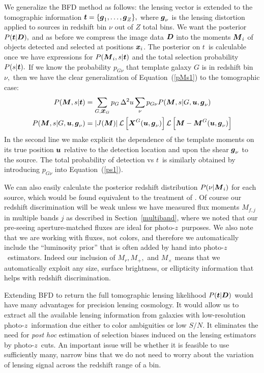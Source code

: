 \documentclass[11pt,preprint,flushrt]{aastex}
\def\eqq#1{Equation~(\ref{#1})}
\newcommand{\vecD}{\mbox{\boldmath $D$}}
\newcommand{\vecX}{\mbox{\boldmath $X$}}
\newcommand{\vecg}{\mbox{\boldmath $g$}}
\newcommand{\vecM}{\mbox{\boldmath $M$}}
\newcommand{\vect}{\mbox{\boldmath $t$}}
\newcommand{\vecx}{\mbox{\boldmath $x$}}
\newcommand{\vecu}{\mbox{\boldmath $u$}}
\newcommand{\likeli}{\mbox{$\mathcal{L}$}}
\newcommand{\photoz}{photo-$z$}
\newcommand\edit[1]{#1}
\begin{document}
We generalize the BFD method as follows: the lensing vector is
extended to the tomographic information
$\vect=\{\vecg_1,\ldots,\vecg_Z\},$ where $\vecg_\nu$ is the 
lensing distortion applied to sources in redshift bin $\nu$ out of $Z$
total bins.  We want the posterior $P(\vect | \vecD),$ and as before
we compress the image data $\vecD$ into the moments $\vecM_i$ of
objects detected and selected at positions $\vecx_i$.  The posterior
on \vect\ is calculable once we have expressions for $P(\vecM_i,s |
\vect)$ and the total selection probability $P(s | \vect).$
If we know the probability $p_{G\nu}$ that
template galaxy $G$ is in redshift bin $\nu,$ then we have the clear
generalization of \eqq{pMs1} to the tomographic case:
\begin{align}
\label{tomo1}
P(\vecM, s | \vect) & = \sum_{G,\vecx_G} p_G \, \Delta^2u\sum_\nu 
p_{G\nu} P(\vecM, s | G, \vecu,\vecg_\nu)\\
P(\vecM, s | G, \vecu, \vecg_\nu) & = \left| J(\vecM) \right|
\likeli\left[\vecX^G(\vecu,\vecg_\nu) \right]
\likeli\left[\vecM- \vecM^G(\vecu,\vecg_\nu) \right]
\end{align}
In the second line we make explicit the dependence of the template
moments on its true position $\vecu$ relative to the detection
location and upon the shear $\vecg_\nu$ to the source. The
total probability of detection vs \vect\ is similarly obtained
by introducing $p_{G\nu}$ into \eqq{ps1}.

We can also easily calculate the posterior redshift distribution $P(\nu |
\vecM_i)$ for each source, which would be found equivalent to the
treatment of \citet{BPZ}.  Of course our redshift discrimination will
be weak unless we have measured flux moments $M_{f,j}$ in multiple
bands $j$ as described in Section~\ref{multiband}, where we noted that
our pre-seeing aperture-matched fluxes are ideal for \photoz\
purposes.  We also note that we are working with fluxes, not colors,
and therefore we automatically include the ``luminosity prior'' that
is often added by hand into \photoz\ estimators. Indeed our inclusion
of $M_r,M_+,$ and $M_\times$  means that we automatically exploit any
size, surface brightness, or ellipticity information that helps with
redshift discrimination. 

Extending BFD to return the full tomographic lensing
likelihood $P(\vect | \vecD)$ would have many advantages for precision
lensing cosmology.  It would allow us to extract all the available
lensing information from 
galaxies with low-resolution \photoz\ information due either to color
ambiguities or low $S/N.$  It eliminates the need for {\it post hoc} estimation of
selection biases induced on the lensing estimators by \photoz\ cuts.
\edit{An important issue will be whether it is feasible to use
  sufficiently many, narrow bins that we do not need to worry about
  the variation of lensing signal across the redshift range of a bin.}
\end{document}
